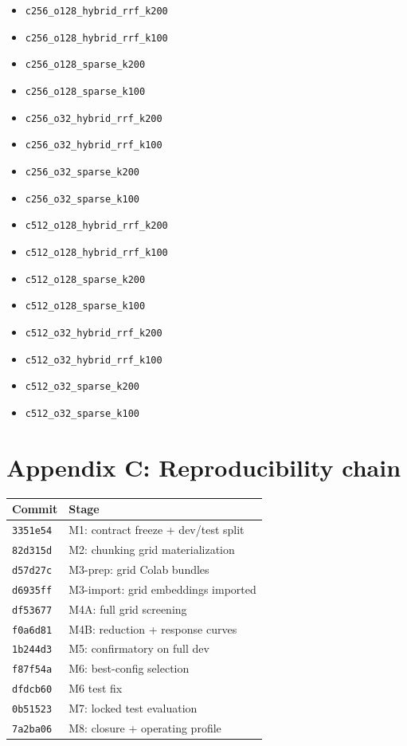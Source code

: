 \documentclass[11pt,a4paper]{article}
\begin{document}
\begin{itemize}[leftmargin=1.5em,itemsep=0.1em]
  \item \texttt{c256\_o128\_hybrid\_rrf\_k200}
  \item \texttt{c256\_o128\_hybrid\_rrf\_k100}
  \item \texttt{c256\_o128\_sparse\_k200}
  \item \texttt{c256\_o128\_sparse\_k100}
  \item \texttt{c256\_o32\_hybrid\_rrf\_k200}
  \item \texttt{c256\_o32\_hybrid\_rrf\_k100}
  \item \texttt{c256\_o32\_sparse\_k200}
  \item \texttt{c256\_o32\_sparse\_k100}
  \item \texttt{c512\_o128\_hybrid\_rrf\_k200}
  \item \texttt{c512\_o128\_hybrid\_rrf\_k100}
  \item \texttt{c512\_o128\_sparse\_k200}
  \item \texttt{c512\_o128\_sparse\_k100}
  \item \texttt{c512\_o32\_hybrid\_rrf\_k200}
  \item \texttt{c512\_o32\_hybrid\_rrf\_k100}
  \item \texttt{c512\_o32\_sparse\_k200}
  \item \texttt{c512\_o32\_sparse\_k100}
\end{itemize}

\section{Appendix C: Reproducibility chain}

\begin{center}
\small
\begin{tabular}{l l}
\toprule
\textbf{Commit} & \textbf{Stage} \\
\midrule
\texttt{3351e54} & M1: contract freeze + dev/test split \\
\texttt{82d315d} & M2: chunking grid materialization \\
\texttt{d57d27c} & M3-prep: grid Colab bundles \\
\texttt{d6935ff} & M3-import: grid embeddings imported \\
\texttt{df53677} & M4A: full grid screening \\
\texttt{f0a6d81} & M4B: reduction + response curves \\
\texttt{1b244d3} & M5: confirmatory on full dev \\
\texttt{f87f54a} & M6: best-config selection \\
\texttt{dfdcb60} & M6 test fix \\
\texttt{0b51523} & M7: locked test evaluation \\
\texttt{7a2ba06} & M8: closure + operating profile \\
\bottomrule
\end{tabular}
\end{center}
\end{document}
